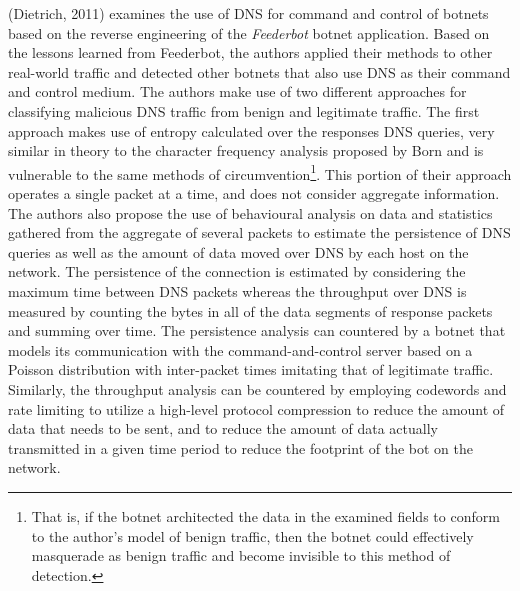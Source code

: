 \documentclass[12pt]{article}
\theoremstyle{remark}
\theoremstyle{definition}
\theoremstyle{definition}
\theoremstyle{definition}
\begin{document}
(Dietrich, 2011)\cite{Dietrich2011} examines the use of DNS for command and control of botnets based on the reverse engineering of the \emph{Feederbot} botnet application. Based on the lessons learned from Feederbot, the authors applied their methods to other real-world traffic and detected other botnets that also use DNS as their command and control medium. The authors make use of two different approaches for classifying malicious DNS traffic from benign and legitimate traffic. The first approach makes use of entropy calculated over the responses DNS queries, very similar in theory to the character frequency analysis proposed by Born\cite{Born2010.cfa} and is vulnerable to the same methods of circumvention\footnote{That is, if the botnet architected the data in the examined fields to conform to the author's model of benign traffic, then the botnet could effectively masquerade as benign traffic and become invisible to this method of detection.}. This portion of their approach operates a single packet at a time, and does not consider aggregate information. The authors also propose the use of behavioural analysis on data and statistics gathered from the aggregate of several packets to estimate the persistence of DNS queries as well as the amount of data moved over DNS by each host on the network. The persistence of the connection is estimated by considering the maximum time between DNS packets whereas the throughput over DNS is measured by counting the bytes in all of the data segments of response packets and summing over time. The persistence analysis can countered by a botnet that models its communication with the command-and-control server based on a Poisson distribution with inter-packet times imitating that of legitimate traffic. Similarly, the throughput analysis can be countered by employing codewords and rate limiting to utilize a high-level protocol compression to reduce the amount of data that needs to be sent, and to reduce the amount of data actually transmitted in a given time period to reduce the footprint of the bot on the network.
\end{document}
